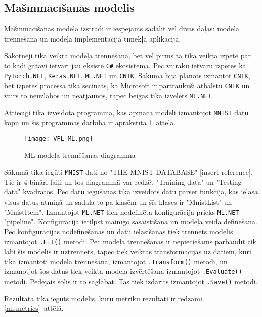 \subsection{Mašīnmācīšanās modelis}

    Mašīnmācīšanās modeļa izstrādi ir iespējams sadalīt vēl divās daļās: modeļa trennēšana un modeļa
    implementācija tīmekļa aplikācijā.

    Sākotnēji tika veikta modeļa trennēšana, bet vēl pirms tā tika veikta izpēte par to kādi gatavi
    ietvari jau eksistē \texttt{C\#} ekosistēmā. Pēc vairāku ietvaru izpētes kā \texttt{PyTorch.NET},
    \texttt{Keras.NET}, \texttt{ML.NET} un \texttt{CNTK}. Sākumā bija plānots izmantot \texttt{CNTK},
    bet izpētes processā tika secināts, ka Microsoft ir pārtraukuši atbalstu \texttt{CNTK} un vairs
    to neuzlabos un neatjaunos, tapēc beigas tika izvēlēts \texttt{ML.NET}.

    Attiecīgi tika izveidota programma, kas apmāca modeli izmantojot \texttt{MNIST} datu kopu un
    šīs programmas darbība ir aprakstīta \ref{ml:train}~attēlā.

    \begin{figure}[H]
        \centering
        \texttt{[image: VPL-ML.png]}
        \caption{ML modeļa trennēšanas diagramma}
        \label{ml:train}
    \end{figure}

    Sākumā tika iegūti \texttt{MNIST} dati no "THE MNIST DATABASE" [insert reference]. Tie ir 4 bināri
    faili un tos diagrammā var redzēt "Training data" un "Testing data" kvadrātos. Pēc datu iegūšanas
    tika izveidots datu parser funkcija, kas ielasa visus datus atmiņā un sadala to pa klasēm un šīs
    klases ir "MnistList" un "MnistItem". Izmantojot \texttt{ML.NET} tiek nodefinēta konfigurācija
    prieks \texttt{ML.NET} "pipeline". Konfigurācijā ietilpst mainīgo sasaistīšana un modeļa veida
    definēšana. Pēc konfigurācijas nodefinēšanas un datu ielasīšanas tiek trennēts modelis izmantojot
    \texttt{.Fit()} metodi. Pēc modeļa trennēšanas ir nepieciešams pārbaudīt cik labi šis
    modelis ir uztrennēts, tapēc tiek veiktas transformācijas uz datiem, kuri tika izmantoti modeļa
    trennēšanā, izmantojot \texttt{.Transform()} metodi, un izmanotjot šos datus tiek
    veikta modeļa izvērtēšana izmantojot \texttt{.Evaluate()} metodi. Pēdejais solis ir
    to saglabāt. Tas tiek izdarīts izmantojot \texttt{.Save()} metodi.

    Rezultātā tika iegūts modelis, kuru metriku rezultāti ir redzami \ref{ml:metrics}~attēlā.

